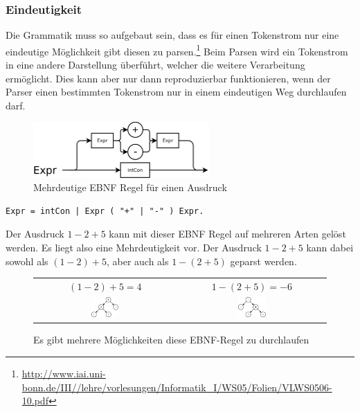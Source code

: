 \newpage

\subsubsection{Eindeutigkeit}

Die Grammatik muss so aufgebaut sein, dass es für einen Tokenstrom nur eine eindeutige Möglichkeit gibt diesen zu parsen.\footnote{\url{http://www.iai.uni-bonn.de/III//lehre/vorlesungen/Informatik_I/WS05/Folien/VLWS0506-10.pdf}} Beim Parsen wird ein Tokenstrom in eine andere Darstellung \"uberf\"uhrt, welcher die weitere Verarbeitung erm\"oglicht. Dies kann aber nur dann reproduzierbar funktionieren, wenn der Parser einen bestimmten Tokenstrom nur in einem eindeutigen Weg durchlaufen darf.


\begin{figure}[h]
\centering
\includegraphics[width=0.6\textwidth]{./media/images/compiler/ambiguity_wrong.png}
\caption{Mehrdeutige EBNF Regel f\"ur einen Ausdruck}
\label{compiler_ambiguity_wrong}
\end{figure}

\begin{lstlisting}[language=EBNF]
Expr = intCon | Expr ( "+" | "-" ) Expr.
\end{lstlisting}

Der Ausdruck $1-2+5$ kann mit dieser EBNF Regel auf mehreren Arten gelöst werden. Es liegt also eine Mehrdeutigkeit vor. Der Ausdruck $1-2+5$ kann dabei sowohl als $(1-2)+5$, aber auch als $1-(2+5)$ geparst werden.

\begin{figure}[h]
\centering
\begin{tabular}{ c | c }
  $(1-2)+5=4$ & 
  $1-(2+5)=-6$ \\
  \includegraphics[width=0.2\textwidth]{./media/images/compiler/ambiguity_tree_correct.png} & 
  \includegraphics[width=0.2\textwidth]{./media/images/compiler/ambiguity_tree_wrong.png} \\
\end{tabular}
\caption{Es gibt mehrere M\"oglichkeiten diese EBNF-Regel zu durchlaufen}
\label{compiler_ambiguity_wrong_possible_ways}
\end{figure}

